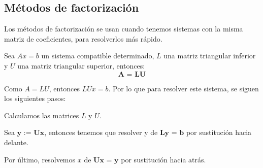 \subsection{Métodos de factorización}
Los métodos de factorización se usan cuando tenemos sistemas con la misma matriz de coeficientes, para resolverlos más rápido.
		
\begin{ndef}[Factorización LU]
Sea $Ax = b$ un sistema compatible determinado, $L$ una matriz triangular inferior y $U$ una matriz triangular superior, entonces:
\[ \textbf{A = LU} \]
\end{ndef}

Como $A = LU$, entonces $LUx = b$. Por lo que para resolver este sistema, se siguen los siguientes pasos:
		
\begin{nlist}
\item Calculamos las matrices $L$ y $U$.
\item Sea $\textbf{y := Ux}$, entonces tenemos que resolver y de $\textbf{Ly = b}$ por sustitución hacia delante.
\item Por último, resolvemos $x$ de $\textbf{Ux = y}$ por sustitución hacia atrás.
\end{nlist}
			
